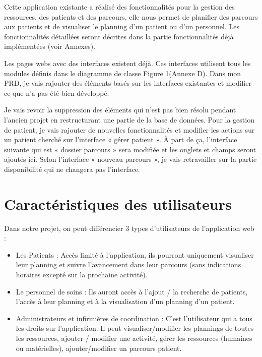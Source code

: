 \documentclass{polytech/polytech}
\begin{document}
Cette application existante a réalisé des fonctionnalités pour la gestion des ressources, des patients et des parcours, elle nous permet de planifier des parcours aux patients et de visualiser le planning d'un patient ou d'un personnel. Les fonctionnalités détaillées seront décrites dans la partie fonctionnalités déjà implémentées (voir Annexes).

Les pages webs avec des interfaces existent déjà. Ces interfaces utilisent tous les modules définis dans le diagramme de classe Figure 1(Annexe D). Dans mon PRD, je vais rajouter des éléments basés sur les interfaces existantes et modifier ce que n’a pas été bien développé. 

Je vais revoir la suppression des éléments qui n'est pas bien résolu pendant l'ancien projet en restructurant une partie de la base de données. Pour la gestion de patient, je vais rajouter de nouvelles fonctionnalités et modifier les actions sur un patient cherché sur l'interface « gérer patient ». À part de ça, l'interface suivante qui est « dossier parcours » sera modifiée et les onglets et champs seront ajoutés ici. Selon l'interface « nouveau parcours », je vais retravailler sur la partie disponibilité qui ne changera pas l'interface.


\section{Caractéristiques des utilisateurs}



Dans notre projet, on peut différencier 3 types d’utilisateurs de l’application web :

\begin{itemize}
	\item Les Patients : Accès limité à l'application, ils pourront uniquement visualiser leur planning et suivre l'avancement dans leur parcours (sans indications horaires excepté sur la prochaine activité).
	\item Le personnel de soins : Ils auront accès à l'ajout / la recherche de patients, l'accès à leur planning et à la visualisation d'un planning d'un patient.
	\item Administrateurs et infirmières de coordination : C'est l'utilisateur qui a tous les droits sur l'application. Il peut visualiser/modifier les plannings de toutes les ressources, ajouter / modifier une activité, gérer les ressources (humaines ou matérielles), ajouter/modifier un parcours patient.
\end{itemize}
\end{document}
